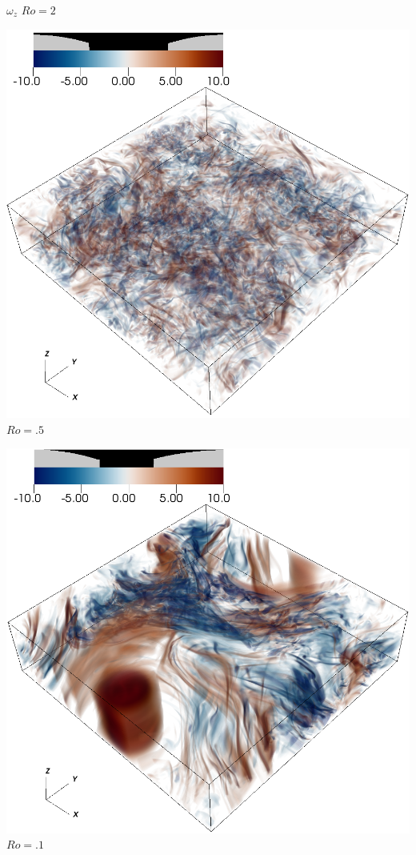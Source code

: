 \documentclass[30pt, blockverticalspace=1cm]{tikzposter}
\begin{document}
\begin{columns}
{    \begin{center}

        
        \centering
        {\Large $\omega_z$}
    \emp
        \centering
        {\Large $Ro = 2$}
        \vspace{10pt}

        \includegraphics[width=.85\linewidth]{images/vortz_Om0.5_vr2.png}
    \emp
        \centering
        {\Large $Ro = .5$}

        \vspace{10pt}
        \includegraphics[width=.85\linewidth]{images/vortz_Om2_vr2.png}
    \emp
        \centering
        {\Large $Ro = .1$}


\end{center}}
\end{columns}
\end{document}
